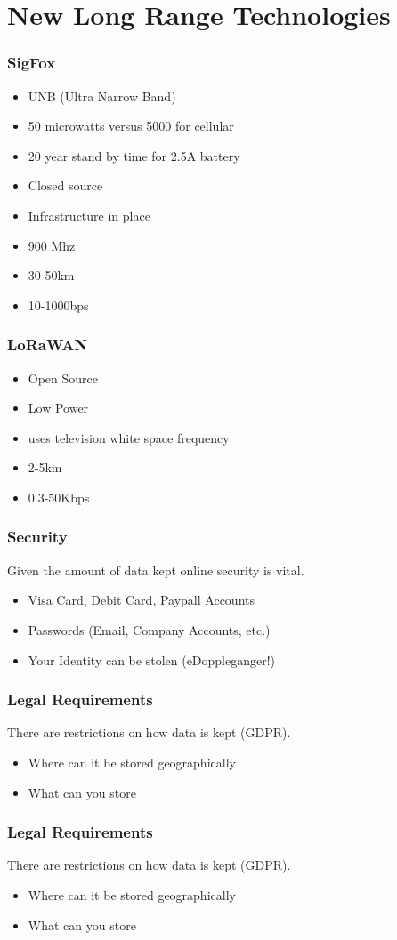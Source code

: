 \documentclass{beamer}
\begin{document}
 \section{New Long Range Technologies}
  \begin{frame}
  	\frametitle{SigFox}
  	\begin{itemize}
  	\item UNB (Ultra Narrow Band)
  	\item 50 microwatts versus 5000  for cellular
  	\item 20 year stand by time for 2.5A battery
  	\item Closed source
  	\item Infrastructure in place
  	\item 900 Mhz
  	\item 30-50km
  	\item 10-1000bps
  	\end{itemize}
  \end{frame}
  \begin{frame}
  	\frametitle{LoRaWAN}
  	\begin{itemize}
  	\item Open Source
  	\item Low Power
  	\item uses television white space frequency
  	\item 2-5km
  	\item 0.3-50Kbps
  	\end{itemize}
  \end{frame}  
  
  
 
             \begin{frame}
  	\frametitle{Security}
  	Given the amount of data kept online security is vital.
  	\begin{itemize}
  		\item Visa Card, Debit Card, Paypall Accounts
  		\item Passwords (Email, Company Accounts, etc.)
  		\item Your Identity can be stolen (eDoppleganger!)
  	\end{itemize}
  \end{frame} 
               \begin{frame}
  	\frametitle{Legal Requirements}
  	There are restrictions on how data is kept (GDPR).
  	\begin{itemize}
  		\item Where can it be stored geographically
  		\item What can you store
  	\end{itemize}
  \end{frame} 
                 \begin{frame}
  	\frametitle{Legal Requirements}
  	There are restrictions on how data is kept (GDPR).
  	\begin{itemize}
  		\item Where can it be stored geographically
  		\item What can you store
  	\end{itemize}
  \end{frame} 
  
\end{document}
